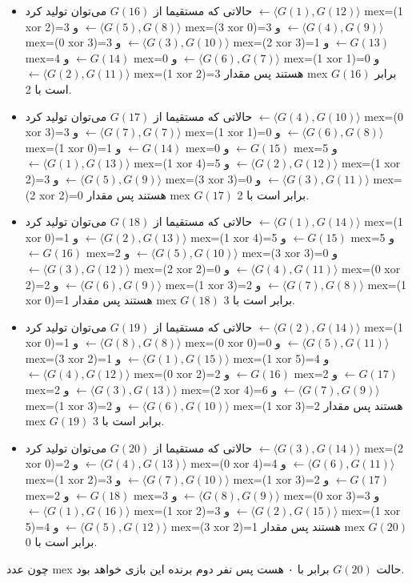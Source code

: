 \begin{solution}
\begin{itemize}
		\item حالاتی که مستقیما از $G(16)$ می‌توان تولید کرد $\leftarrow \langle G(1), G(12) \rangle$ mex=(1 xor 2)=3 و $\leftarrow \langle G(5), G(8) \rangle$ mex=(3 xor 0)=3 و $\leftarrow \langle G(4), G(9) \rangle$ mex=(0 xor 3)=3 و $\leftarrow \langle G(3), G(10) \rangle$ mex=(2 xor 3)=1 و $\leftarrow G(13)$ mex=4 و $\leftarrow G(14)$ mex=0 و $\leftarrow \langle G(6), G(7) \rangle$ mex=(1 xor 1)=0 و $\leftarrow \langle G(2), G(11) \rangle$ mex=(1 xor 2)=3  هستند پس مقدار mex  $G(16)$ برابر است با 2.
		\item حالاتی که مستقیما از $G(17)$ می‌توان تولید کرد $\leftarrow \langle G(4), G(10) \rangle$ mex=(0 xor 3)=3 و $\leftarrow \langle G(7), G(7) \rangle$ mex=(1 xor 1)=0 و $\leftarrow \langle G(6), G(8) \rangle$ mex=(1 xor 0)=1 و $\leftarrow G(14)$ mex=0 و $\leftarrow G(15)$ mex=5 و $\leftarrow \langle G(1), G(13) \rangle$ mex=(1 xor 4)=5 و $\leftarrow \langle G(2), G(12) \rangle$ mex=(1 xor 2)=3 و $\leftarrow \langle G(5), G(9) \rangle$ mex=(3 xor 3)=0 و $\leftarrow \langle G(3), G(11) \rangle$ mex=(2 xor 2)=0  هستند پس مقدار mex  $G(17)$ برابر است با 2.
		\item حالاتی که مستقیما از $G(18)$ می‌توان تولید کرد $\leftarrow \langle G(1), G(14) \rangle$ mex=(1 xor 0)=1 و $\leftarrow \langle G(2), G(13) \rangle$ mex=(1 xor 4)=5 و $\leftarrow G(15)$ mex=5 و $\leftarrow G(16)$ mex=2 و $\leftarrow \langle G(5), G(10) \rangle$ mex=(3 xor 3)=0 و $\leftarrow \langle G(3), G(12) \rangle$ mex=(2 xor 2)=0 و $\leftarrow \langle G(4), G(11) \rangle$ mex=(0 xor 2)=2 و $\leftarrow \langle G(6), G(9) \rangle$ mex=(1 xor 3)=2 و $\leftarrow \langle G(7), G(8) \rangle$ mex=(1 xor 0)=1  هستند پس مقدار mex  $G(18)$ برابر است با 3.
		\item حالاتی که مستقیما از $G(19)$ می‌توان تولید کرد $\leftarrow \langle G(2), G(14) \rangle$ mex=(1 xor 0)=1 و $\leftarrow \langle G(8), G(8) \rangle$ mex=(0 xor 0)=0 و $\leftarrow \langle G(5), G(11) \rangle$ mex=(3 xor 2)=1 و $\leftarrow \langle G(1), G(15) \rangle$ mex=(1 xor 5)=4 و $\leftarrow \langle G(4), G(12) \rangle$ mex=(0 xor 2)=2 و $\leftarrow G(16)$ mex=2 و $\leftarrow G(17)$ mex=2 و $\leftarrow \langle G(3), G(13) \rangle$ mex=(2 xor 4)=6 و $\leftarrow \langle G(7), G(9) \rangle$ mex=(1 xor 3)=2 و $\leftarrow \langle G(6), G(10) \rangle$ mex=(1 xor 3)=2  هستند پس مقدار mex  $G(19)$ برابر است با 3.
		\item حالاتی که مستقیما از $G(20)$ می‌توان تولید کرد $\leftarrow \langle G(3), G(14) \rangle$ mex=(2 xor 0)=2 و $\leftarrow \langle G(4), G(13) \rangle$ mex=(0 xor 4)=4 و $\leftarrow \langle G(6), G(11) \rangle$ mex=(1 xor 2)=3 و $\leftarrow \langle G(7), G(10) \rangle$ mex=(1 xor 3)=2 و $\leftarrow G(17)$ mex=2 و $\leftarrow G(18)$ mex=3 و $\leftarrow \langle G(8), G(9) \rangle$ mex=(0 xor 3)=3 و $\leftarrow \langle G(1), G(16) \rangle$ mex=(1 xor 2)=3 و $\leftarrow \langle G(2), G(15) \rangle$ mex=(1 xor 5)=4 و $\leftarrow \langle G(5), G(12) \rangle$ mex=(3 xor 2)=1  هستند پس مقدار mex  $G(20)$ برابر است با 0.
	\end{itemize}
	
چون عدد mex حالت $G(20)$ برابر با ۰ هست پس نفر دوم برنده این بازی خواهد بود.
\end{solution}
